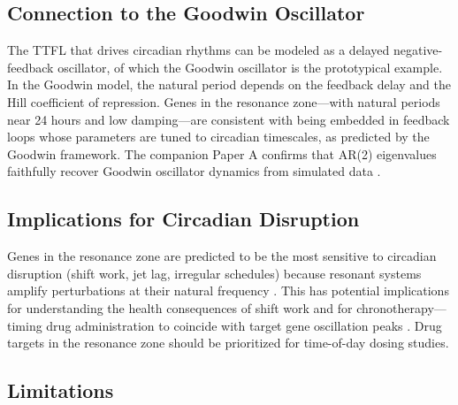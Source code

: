 \documentclass[11pt,letterpaper]{article}
\begin{document}
\subsection{Connection to the Goodwin Oscillator}

The TTFL that drives circadian rhythms can be modeled as a delayed negative-feedback oscillator, of which the Goodwin oscillator \citep{goodwin1965oscillatory} is the prototypical example. In the Goodwin model, the natural period depends on the feedback delay and the Hill coefficient of repression. Genes in the resonance zone---with natural periods near 24 hours and low damping---are consistent with being embedded in feedback loops whose parameters are tuned to circadian timescales, as predicted by the Goodwin framework. The companion Paper A confirms that AR(2) eigenvalues faithfully recover Goodwin oscillator dynamics from simulated data \citep{whiteside2026par2}.

\subsection{Implications for Circadian Disruption}

Genes in the resonance zone are predicted to be the most sensitive to circadian disruption (shift work, jet lag, irregular schedules) because resonant systems amplify perturbations at their natural frequency \citep{strogatz2001nonlinear}. This has potential implications for understanding the health consequences of shift work \citep{straif2007carcinogenicity} and for chronotherapy---timing drug administration to coincide with target gene oscillation peaks \citep{dallmann2016chronopharmacology, levi2010circadian}. Drug targets in the resonance zone should be prioritized for time-of-day dosing studies.

\subsection{Limitations}
\end{document}
